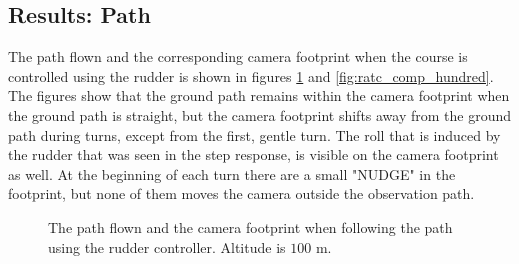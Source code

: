 \subsection{Results: Path}

The path flown and the corresponding camera footprint when the course is controlled using the rudder is shown in figures \ref{fig:ratc_path_hundred} and \ref{fig:ratc_comp_hundred}. The figures show that the ground path remains within the camera footprint when the ground path is straight, but the camera footprint shifts away from the ground path during turns, except from the first, gentle turn. The roll that is induced by the rudder that was seen in the step response, is visible on the camera footprint as well. At the beginning of each turn there are a small "NUDGE" in the footprint, but none of them moves the camera outside the observation path.

\begin{figure}[]
    \centering
    \caption{The path flown and the camera footprint when following the path using the rudder controller. Altitude is $100$ m.}
	\label{fig:ratc_path_hundred}
\end{figure}

